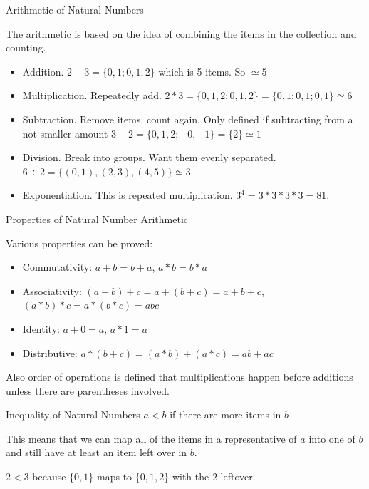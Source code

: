 \documentclass{beamer}
\begin{document}
\begin{frame}{Arithmetic of Natural Numbers}

The arithmetic is based on the idea of combining the items in the collection and counting. 

\pause

\begin{itemize}
\item Addition.  $2 + 3 = \{0, 1; 0, 1, 2\}$ which is 5 items. So $\simeq 5$
\item Multiplication. Repeatedly add. $2*3 =  \{0, 1, 2; 0, 1, 2\} = \{0,1; 0,1; 0,1\} \simeq 6$
\item Subtraction. Remove items, count again. Only defined if subtracting from a not smaller amount $ 3-2 = \{0, 1, 2; -0, -1\} = \{2\} \simeq 1$
\item Division. Break into groups. Want them evenly separated. $6 \div 2 = \{ (0,1), (2,3), (4,5)\} \simeq 3$
\item Exponentiation. This is repeated multiplication. $3^4 =3*3*3*3 = 81$.
\end{itemize} 

\end{frame}

\begin{frame}{Properties of Natural Number Arithmetic}

Various properties can be proved: 
\begin{itemize}
\item Commutativity: $a+b = b+a$, $a*b = b*a$
\item Associativity: $(a+b)+c = a + (b+c) = a+b+c$, $(a*b)*c=a*(b*c)=abc$ 
\item Identity: $a+0 = a$, $a*1 = a$
\item Distributive:  $a*(b+c) = (a*b) + (a*c) = ab + ac$
\end{itemize}
    
Also order of operations is defined that multiplications happen before additions unless there are parentheses involved. 

\end{frame}


\begin{frame}{Inequality of Natural Numbers}
    $a < b$ if there are more items in $b$

    This means that we can map all of the items in a representative of $a$ into one of $b$ and still have at least an item left over in $b$.

    $2 < 3$ because $\{0,1\}$ maps to $\{0, 1, 2\}$ with the $2$ leftover.
    
\end{frame}
\end{document}
